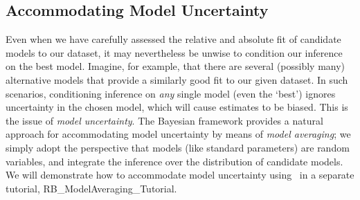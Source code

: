 \subsection{Accommodating Model Uncertainty}
Even when we have carefully assessed the relative and absolute fit of candidate models to our dataset, it may nevertheless be unwise to condition our inference on the best model.
Imagine, for example, that there are several (possibly many) alternative models that provide a similarly good fit to our given dataset.
In such scenarios, conditioning inference on \textit{any} single model (even the `best') ignores uncertainty in the chosen model, which will cause estimates to be biased.
This is the issue of \emph{model uncertainty}.
The Bayesian framework provides a natural approach for accommodating model uncertainty by means of \textit{model averaging}; we simply adopt the perspective that models (like standard parameters) are random variables, and integrate the inference over the distribution of candidate models.
We will demonstrate how to accommodate model uncertainty using \RevBayes~in a separate tutorial, RB\_ModelAveraging\_Tutorial.


